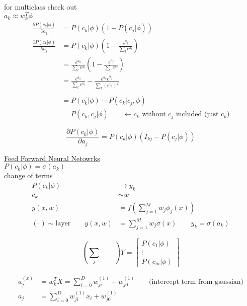 for multiclass check out\\

$a_k\approx w_k^T\phi$\\
\begin{align*}
\frac{\partial P(c_k|\phi)}{\partial a_j} & = P(c_k|\phi)\left( 1 - P(c_j|\phi)\right)\\
\frac{\partial P(c_k|\phi)}{\partial a_j} & = P(c_k|\phi) \left( 1 - \frac{e^{a_j}}{\sum_l e^{a_l}}\right)\\
 & = \frac{e^{a_k}}{\sum_l e^{a_l}} \left( 1 - \frac{e^{a_j}}{\sum_l e^{a_l}}\right)\\
 & = \frac{e^{a_k}}{\sum_l e^{a_l}} - \frac{e^{a_k}e^{a_j}}{\sum_l \left(e^{a_l}\right)^2}\\
\\
& = P(c_k|\phi) - P(c_k|c_j,\phi)\\
& = P(c_k, c_j|\phi)\qquad \longleftarrow c_k \text{\ without\ }c_j\text{\ included (just\ }c_k\text{)}
\end{align*}

\begin{equation*}
\frac{\partial P( c_k | \phi )}{\partial a_j}=
P(c_k|\phi)\left(I_{kj}-P( c_j | \phi ) \right)
\end{equation*}

\newpage

\underline{Feed Forward Neural Netowrks}\\

$P( c_k | \phi ) = \sigma( a_k )$\\

change of terms 
\begin{align*}
P( c_k | \phi ) & \to y_k \\
c_k  & \sim w \\
y(x,w) & = f\left( \sum_{j=1}^{M} w_j \phi_j( x ) \right) \\
(\cdot) \sim\text{layer}  \qquad y(x,w) & = \sum_{j=1}^{M}w_j \sigma( x ) \qquad y_k = \sigma(a_k) 
\end{align*}

\begin{equation*}
\left( \sum_j \qquad \right)Y = \left[ \begin{array}{c} P(c_1|\phi) \\ \vdots \\ P(c_m|\phi) \end{array} \right]
\end{equation*}

\begin{align*}
a_j^{(x)} & = w^{T}_{k}X = \sum_{i=0}^{D} w_{ji}^{(1)}+ w_{j0}^{(1)} \qquad \text{(intercept\ term\ from\ gaussian)} \\
a_j & = \sum_{i=0}^{D} w_{ji}^{(1)}x_i + w_{j0}^{(1)} 
\end{align*}

